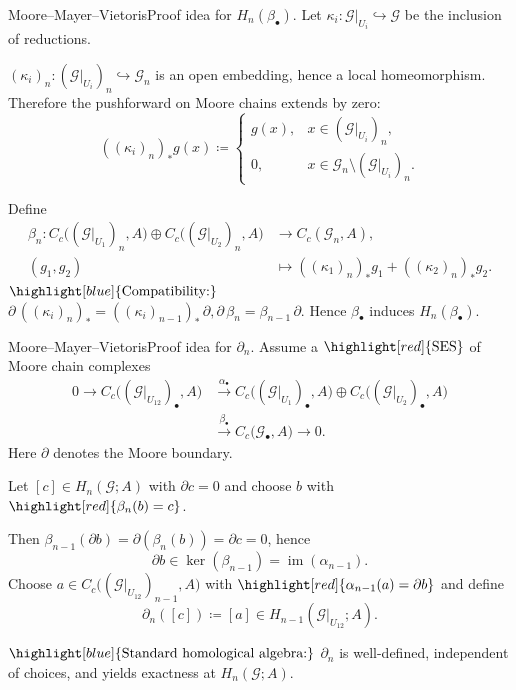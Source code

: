 \documentclass[aspectratio=169]{beamer}
\newcommand{\G}{\mathcal{G}}
\begin{document}
\begin{frame}{Moore--Mayer--Vietoris}{Proof idea for \(H_n(\beta_\bullet)\).}
  Let \(\kappa_i\colon \G|_{U_i}\hookrightarrow \G\) be the inclusion of reductions.

  \((\kappa_i)_n\colon (\G|_{U_i})_n\hookrightarrow \G_n\) is an open embedding, hence a local homeomorphism.
  Therefore the pushforward on Moore chains extends by zero:
  \[
    ((\kappa_i)_n)_* g(x)\coloneqq
    \begin{cases}
      g(x), & x\in (\G|_{U_i})_n,\\
      0, & x\in \G_n\setminus (\G|_{U_i})_n.
    \end{cases}
  \]

  Define
  \[
    \begin{aligned}
      \beta_n\colon
      C_c\bigl((\G|_{U_1})_n,A\bigr)\oplus C_c\bigl((\G|_{U_2})_n,A\bigr)
      &\to C_c(\G_n,A),\\
      (g_1,g_2) &\mapsto ((\kappa_1)_n)_* g_1 + ((\kappa_2)_n)_* g_2.
    \end{aligned}
  \]
  \(\highlight[blue]{\text{Compatibility:}}\)
  \(
    \partial\,((\kappa_i)_n)_* = ((\kappa_i)_{n-1})_*\,\partial,
    \partial\,\beta_n = \beta_{n-1}\,\partial.
  \)
  Hence \(\beta_\bullet\) induces \(H_n(\beta_\bullet)\).
\end{frame}

\begin{frame}{Moore--Mayer--Vietoris}{Proof idea for \(\partial_n\).}
  Assume a \(\highlight[red]{\text{SES}}\) of Moore chain complexes
  \[
    \begin{aligned}
      0 \to C_c\bigl((\G|_{U_{12}})_\bullet,A\bigr)
      &\xrightarrow{\alpha_\bullet}
      C_c\bigl((\G|_{U_1})_\bullet,A\bigr)\oplus C_c\bigl((\G|_{U_2})_\bullet,A\bigr)
      \\
      &\xrightarrow{\beta_\bullet}
      C_c\bigl(\G_\bullet,A\bigr)\to 0.
    \end{aligned}
  \]
  Here \(\partial\) denotes the Moore boundary.

  Let \([c]\in H_n(\G;A)\) with \(\partial c=0\) and choose \(b\) with \(\highlight[red]{\beta_n(b)=c}\).

  Then \(\beta_{n-1}(\partial b)=\partial(\beta_n(b))=\partial c=0\), hence
  \[
    \partial b\in \ker(\beta_{n-1})=\operatorname{im}(\alpha_{n-1}).
  \]
  Choose \(a\in C_c\bigl((\G|_{U_{12}})_{n-1},A\bigr)\) with \(\highlight[red]{\alpha_{n-1}(a)=\partial b}\) and define
  \[
    \partial_n([c])\coloneqq [a]\in H_{n-1}(\G|_{U_{12}};A).
  \]

  \(\highlight[blue]{\text{Standard homological algebra:}}\)
  \(\partial_n\) is well-defined, independent of choices, and yields exactness at \(H_n(\G;A)\).
\end{frame}
\end{document}
